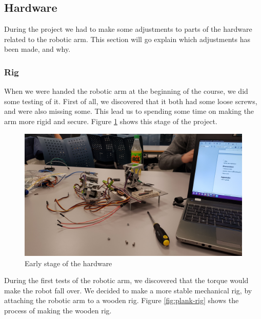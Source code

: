 \documentclass[11pt,a4paper, titlepage]{article}
\begin{document}
	\subsection{Hardware}
	During the project we had to make some adjustments to parts of the hardware related to the robotic arm. This section will go explain which adjustments has been made, and why.
	\subsubsection{Rig}
	When we were handed the robotic arm at the beginning of the course, we did some testing of it. First of all, we discovered that it both had some loose screws, and were also missing some. This lead us to spending some time on making the arm more rigid and secure. Figure \ref{fig:early-rig} shows this stage of the project.
	
	\begin{figure}[H]
		\centering
		\includegraphics[width=0.8\linewidth]{../Diagrams/early-setup.jpg}
		\caption{Early stage of the hardware}
		\label{fig:early-rig}
	\end{figure}
	
	During the first tests of the robotic arm, we discovered that the torque would make the robot fall over. We decided to make a more stable mechanical rig, by attaching the robotic arm to a wooden rig. Figure \ref{fig:plank-rig} shows the process of making the wooden rig.
	
\end{document}
